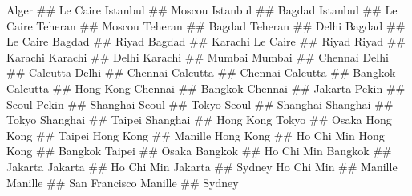 Alger	##	Le Caire
Istanbul	##	Moscou
Istanbul	##	Bagdad
Istanbul	##	Le Caire
Teheran	##	Moscou
Teheran	##	Bagdad
Teheran	##	Delhi
Bagdad	##	Le Caire
Bagdad	##	Riyad
Bagdad	##	Karachi
Le Caire	##	Riyad
Riyad	##	Karachi
Karachi	##	Delhi
Karachi	##	Mumbai
Mumbai ## Chennai
Delhi	##	 Calcutta
Delhi	##	 Chennai
Calcutta	## 	Chennai
Calcutta	## 	Bangkok
Calcutta	## 	Hong Kong
Chennai	##	Bangkok
Chennai	##	Jakarta
Pekin	##	Seoul
Pekin	##	Shanghai
Seoul 	##	Tokyo
Seoul	##	Shanghai
Shanghai	##	Tokyo
Shanghai	##	Taipei
Shanghai	##	Hong Kong
Tokyo	##	Osaka
Hong Kong	##	Taipei
Hong Kong	##	Manille
Hong Kong	##	Ho Chi Min
Hong Kong	##	Bangkok
Taipei	## Osaka
Bangkok	##	Ho Chi Min
Bangkok	##	Jakarta
Jakarta	##	Ho Chi Min
Jakarta	##	Sydney
Ho Chi Min	##	Manille
Manille	##	San Francisco
Manille	##	Sydney
